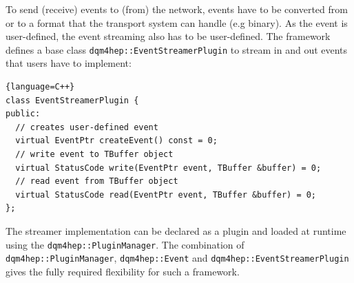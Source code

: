 \documentclass{webofc}
\begin{document}
To send (receive) events to (from) the network, events have to be converted from or to a format that the transport system can handle (e.g binary).
As the event is user-defined, the event streaming also has to be user-defined.
The framework defines a base class \texttt{dqm4hep::EventStreamerPlugin} to stream in and out events that users have to implement:

\begin{lstlisting}{language=C++}
class EventStreamerPlugin {
public:
  // creates user-defined event
  virtual EventPtr createEvent() const = 0;
  // write event to TBuffer object
  virtual StatusCode write(EventPtr event, TBuffer &buffer) = 0;
  // read event from TBuffer object
  virtual StatusCode read(EventPtr event, TBuffer &buffer) = 0;
};
\end{lstlisting}

The streamer implementation can be declared as a plugin and loaded at runtime using the \texttt{dqm4hep::PluginManager}.
The combination of \texttt{dqm4hep::PluginManager}, \texttt{dqm4hep::Event} and \texttt{dqm4hep::EventStreamerPlugin} gives the fully required flexibility for such a framework.
\end{document}
